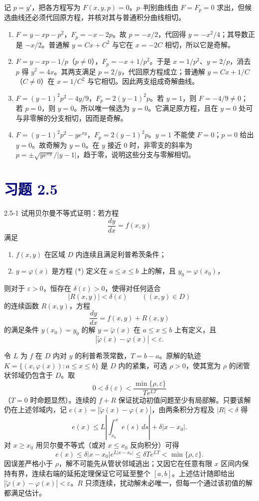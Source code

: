 \documentclass[UTF8,a4paper,11pt]{ctexart}
\newcommand{\sect}[1]{\section*{\textcolor{navy}{习题 #1}}}
\begin{document}
\begin{solution}
记 $p=y'$，把各方程写为 $F(x,y,p)=0$。$p$--判别曲线由 $F=F_p=0$ 求出，但候选曲线还必须代回原方程，并核对其与普通积分曲线相切。
\begin{enumerate}[label=(\arabic*)]
\item $F=y-xp-p^2$，$F_p=-x-2p$。故 $p=-x/2$，代回得 $\boxed{y=-x^2/4}$；其导数正是 $-x/2$。普通解 $y=Cx+C^2$ 与它在 $x=-2C$ 相切，所以它是奇解。
\item $F=y-xp-1/p$（$p\ne0$），$F_p=-x+1/p^2$。于是 $x=1/p^2$、$y=2/p$，消去 $p$ 得 $\boxed{y^2=4x}$。其两支满足 $p=2/y$，代回原方程成立；普通解 $y=Cx+1/C$（$C\ne0$）在 $x=1/C^2$ 与它相切。因此两支组成奇解曲线。
\item $F=(y-1)^2p^2-4y/9$，$F_p=2(y-1)^2p$。若 $y=1$，则 $F=-4/9\ne0$；若 $p=0$，则 $y=0$。所以唯一候选为 $\boxed{y=0}$。它满足原方程，且在 $y=0$ 处可与非零解的分支相切，因而是奇解。
\item $F=(y-1)^2p^2-ye^{xy}$，$F_p=2(y-1)^2p$。$y=1$ 不能使 $F=0$；$p=0$ 给出 $y=0$。故奇解为 $\boxed{y=0}$。在 $y$ 接近 $0$ 时，非零支的斜率为 $p=\pm\sqrt{ye^{xy}}/|y-1|$，趋于零，说明这些分支与零解相切。
\end{enumerate}
\end{solution}

\sect{2.5}
\begin{problem}{2.5-1}
试用贝尔曼不等式证明：若方程
  \[
    \frac{dy}{dx}=f(x,y)\tag{*}
  \]
  满足
  \begin{enumerate}[label=(\arabic*)]
    \item $f(x,y)$ 在区域 $D$ 内连续且满足利普希茨条件；
    \item $y=\varphi(x)$ 是方程 (*) 定义在 $a\le x\le b$ 上的解，且 $y_0=\varphi(x_0)$，
  \end{enumerate}
  则对于 $\varepsilon>0$，恒存在 $\delta(\varepsilon)>0$，使得对任何适合
  \[
    |R(x,y)|<\delta(\varepsilon)\qquad ((x,y)\in D)
  \]
  的连续函数 $R(x,y)$，方程
  \[
    \frac{dy}{dx}=f(x,y)+R(x,y)
  \]
  的满足条件 $y(x_0)=y_0$ 的解 $y=\widetilde{\varphi}(x)$ 在 $a\le x\le b$ 上有定义，且
  \[
    |\widetilde{\varphi}(x)-\varphi(x)|<\varepsilon.
  \]
\end{problem}

\begin{solution}
令 $L$ 为 $f$ 在 $D$ 内对 $y$ 的利普希茨常数，$T=b-a$。原解的轨迹
$K=\{(x,\varphi(x)):a\le x\le b\}$ 是 $D$ 内的紧集，可选 $\rho>0$，使其宽为 $\rho$ 的闭管状邻域仍包含于 $D$。取
\[
0<\delta(\varepsilon)<\frac{\min\{\rho,\varepsilon\}}{T e^{LT}}
\]
（$T=0$ 时命题显然）。连续的 $f+R$ 保证扰动初值问题至少有局部解。只要该解仍在上述邻域内，记 $e(x)=|\widetilde\varphi(x)-\varphi(x)|$，由两条积分方程及 $|R|<\delta$ 得
\[
e(x)\le L\left|\int_{x_0}^x e(s)\,ds\right|+\delta|x-x_0|.
\]
对 $x\ge x_0$ 用贝尔曼不等式（或对 $x\le x_0$ 反向积分）可得
\[
e(x)\le\delta|x-x_0|e^{L|x-x_0|}
\le\delta T e^{LT}<\min\{\rho,\varepsilon\}.
\]
因误差严格小于 $\rho$，解不可能先从管状邻域逃出；又因它在任意有限 $x$ 区间内保持有界，连续右端的延拓定理保证它可延至整个 $[a,b]$。上述估计随即给出 $\boxed{|\widetilde\varphi(x)-\varphi(x)|<\varepsilon}$。$R$ 只须连续，扰动解未必唯一，但每一个通过该初值的解都满足估计。
\end{solution}
\end{document}
